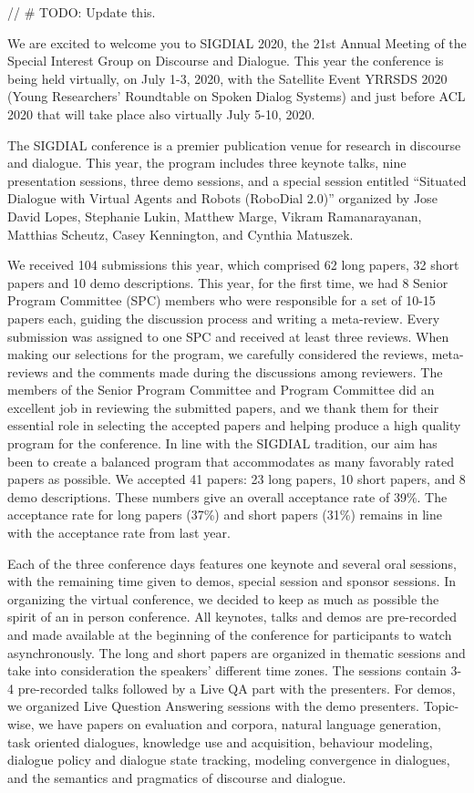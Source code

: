 // # TODO: Update this.

We are excited to welcome you to SIGDIAL 2020, the 21st Annual Meeting of the Special Interest Group on Discourse and Dialogue. This year the conference is being held virtually, on July 1-3, 2020, with the Satellite Event YRRSDS 2020 (Young Researchers' Roundtable on Spoken Dialog Systems) and just before ACL 2020 that will take place also virtually July 5-10, 2020.  

The SIGDIAL conference is a premier publication venue for research in discourse and dialogue. This year, the program includes three keynote talks, nine presentation sessions, three demo sessions, and a special session entitled ``Situated Dialogue with Virtual Agents and Robots (RoboDial 2.0)'' organized by Jose David Lopes, Stephanie Lukin, Matthew Marge, Vikram Ramanarayanan,  Matthias Scheutz, Casey Kennington, and Cynthia Matuszek.

We received 104 submissions this year, which comprised 62 long papers, 32 short papers and 10 demo descriptions. This year, for the first time, we had 8 Senior Program Committee (SPC) members who were responsible for a set of 10-15 papers each, guiding the discussion process and writing a meta-review. Every submission was assigned to one SPC and received at least three reviews. When making our selections for the program, we carefully considered the reviews, meta-reviews and the comments made during the discussions among reviewers. The members of the Senior Program Committee and Program Committee did an excellent job in reviewing the submitted papers, and we thank them for their essential role in selecting the accepted papers and helping produce a high quality program for the conference. In line with the SIGDIAL tradition, our aim has been to create a balanced program that accommodates as many favorably rated papers as possible. We accepted 41 papers: 23 long papers, 10 short papers, and 8 demo descriptions. These numbers give an overall acceptance rate of 39\%. The acceptance rate for long papers (37\%) and short papers (31\%) remains in line with the acceptance rate from last year.

Each of the three conference days features one keynote and several oral sessions, with the remaining time given to demos, special session and sponsor sessions. In organizing the virtual conference, we decided to keep as much as possible the spirit of an in person conference. All keynotes, talks and demos are pre-recorded and made available at the beginning of the conference for participants to watch asynchronously. The long and short papers are organized in thematic sessions and take into consideration the speakers' different time zones.  The sessions contain 3-4 pre-recorded talks followed by a Live QA part with the presenters. For demos, we organized Live Question Answering sessions with the demo presenters. Topic-wise, we have papers on evaluation and corpora, natural language generation, task oriented dialogues, knowledge use and acquisition,  behaviour modeling, dialogue policy and dialogue state tracking, modeling convergence in dialogues, and the semantics and pragmatics of discourse and dialogue. 

